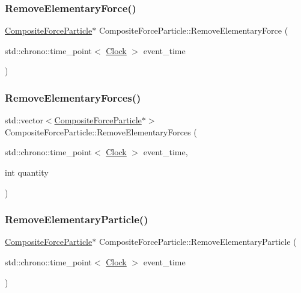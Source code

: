 \subsubsection{\texorpdfstring{Remove\+Elementary\+Force()}{RemoveElementaryForce()}}
{\footnotesize\ttfamily \mbox{\hyperlink{classCompositeForceParticle}{Composite\+Force\+Particle}}$\ast$ Composite\+Force\+Particle\+::\+Remove\+Elementary\+Force (\begin{DoxyParamCaption}\item[{std\+::chrono\+::time\+\_\+point$<$ \mbox{\hyperlink{universe_8h_a0ef8d951d1ca5ab3cfaf7ab4c7a6fd80}{Clock}} $>$}]{event\+\_\+time }\end{DoxyParamCaption})}

\mbox{\label{classCompositeForceParticle_a1bfa61cec4f5a8436c1a188312ba8f45}} 
\subsubsection{\texorpdfstring{Remove\+Elementary\+Forces()}{RemoveElementaryForces()}}
{\footnotesize\ttfamily std\+::vector$<$\mbox{\hyperlink{classCompositeForceParticle}{Composite\+Force\+Particle}}$\ast$$>$ Composite\+Force\+Particle\+::\+Remove\+Elementary\+Forces (\begin{DoxyParamCaption}\item[{std\+::chrono\+::time\+\_\+point$<$ \mbox{\hyperlink{universe_8h_a0ef8d951d1ca5ab3cfaf7ab4c7a6fd80}{Clock}} $>$}]{event\+\_\+time,  }\item[{int}]{quantity }\end{DoxyParamCaption})}

\mbox{\label{classCompositeForceParticle_ab63c4a1d5734f1d13806cb9463075a40}} 
\subsubsection{\texorpdfstring{Remove\+Elementary\+Particle()}{RemoveElementaryParticle()}}
{\footnotesize\ttfamily \mbox{\hyperlink{classCompositeForceParticle}{Composite\+Force\+Particle}}$\ast$ Composite\+Force\+Particle\+::\+Remove\+Elementary\+Particle (\begin{DoxyParamCaption}\item[{std\+::chrono\+::time\+\_\+point$<$ \mbox{\hyperlink{universe_8h_a0ef8d951d1ca5ab3cfaf7ab4c7a6fd80}{Clock}} $>$}]{event\+\_\+time }\end{DoxyParamCaption})}

